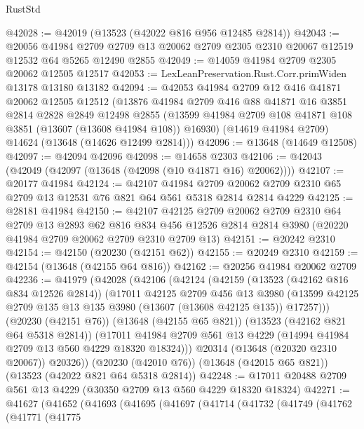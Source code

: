 \begin{lexlean}{RustStd}
\begin{coremodule}
@42028 := @42019 (@13523 (@42022 @816 @956 @12485 @2814))
@42043 := @20056
    @41984
    @2709
    @2709
    @13
    @20062
    @2709
    @2305
    @2310
    @20067
    @12519
    @12532
    @64
    @5265
    @12490
    @2855
@42049 := @14059 @41984 @2709 @2305 @20062 @12505 @12517
@42053 := LexLeanPreservation.Rust.Corr.primWiden @13178 @13180 @13182
@42094 := @42053
    @41984
    @2709
    @12
    @416
    @41871
    @20062
    @12505
    @12512
    (@13876
      @41984
      @2709
      @416
      @88
      @41871
      @16
      @3851
      @2814
      @2828
      @2849
      @12498
      @2855
      (@13599 @41984 @2709 @108 @41871 @108 @3851 (@13607 (@13608 @41984 @108)) @16930)
      (@14619 @41984 @2709)
      @14624
      (@13648 (@14626 @12499 @2814)))
@42096 := @13648 (@14649 @12508)
@42097 := @42094 @42096
@42098 := @14658 @2303
@42106 := @42043 (@42049 (@42097 (@13648 (@42098 (@10 @41871 @16) @20062))))
@42107 := @20177 @41984
@42124 := @42107
    @41984
    @2709
    @20062
    @2709
    @2310
    @65
    @2709
    @13
    @12531
    @76
    @821
    @64
    @561
    @5318
    @2814
    @2814
    @4229
@42125 := @28181 @41984
@42150 := @42107
    @42125
    @2709
    @20062
    @2709
    @2310
    @64
    @2709
    @13
    @2893
    @62
    @816
    @834
    @456
    @12526
    @2814
    @2814
    @3980
    (@20220 @41984 @2709 @20062 @2709 @2310 @2709 @13)
@42151 := @20242 @2310
@42154 := @42150 (@20230 (@42151 @62))
@42155 := @20249 @2310
@42159 := @42154 (@13648 (@42155 @64 @816))
@42162 := @20256 @41984 @20062 @2709
@42236 := @41979
    (@42028
      (@42106
        (@42124
          (@42159
            (@13523 (@42162 @816 @834 @12526 @2814))
            (@17011
              @42125
              @2709
              @456
              @13
              @3980
              (@13599 @42125 @2709 @135 @13 @135 @3980 (@13607 (@13608 @42125 @135)) @17257)))
          (@20230 (@42151 @76))
          (@13648 (@42155 @65 @821))
          (@13523 (@42162 @821 @64 @5318 @2814))
          (@17011 @41984 @2709 @561 @13 @4229 (@14994 @41984 @2709 @13 @560 @4229 @18320 @18324)))
        @20314
        (@13648 (@20320 @2310 @20067))
        @20326))
    (@20230 (@42010 @76))
    (@13648 (@42015 @65 @821))
    (@13523 (@42022 @821 @64 @5318 @2814))
@42248 := @17011 @20488 @2709 @561 @13 @4229 (@30350 @2709 @13 @560 @4229 @18320 @18324)
@42271 := @41627
    (@41652
      (@41693
        (@41695
          (@41697
            (@41714
              (@41732
                (@41749
                  (@41762
                    (@41771
                      (@41775

\end{coremodule}
\end{lexlean}
